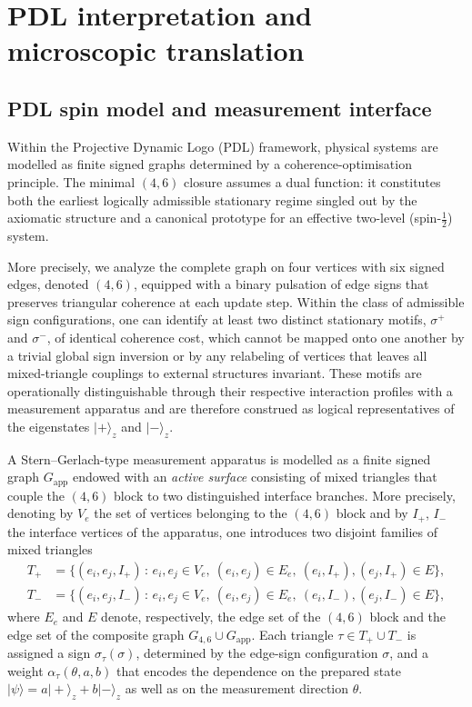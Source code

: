 \documentclass[11pt,a4paper]{article}
\numberwithin{equation}{section}
\theoremstyle{definition}
\begin{document}
\section{PDL interpretation and microscopic translation}
\label{sec:PDL-translation}

\subsection{PDL spin model and measurement interface}

Within the Projective Dynamic Logo (PDL) framework, physical systems are modelled as finite signed graphs determined by a coherence-optimisation principle.\cite{LaubscherLDP2026} The minimal $(4,6)$ closure assumes a dual function: it constitutes both the earliest logically admissible stationary regime singled out by the axiomatic structure and a canonical prototype for an effective two-level (spin-$\tfrac12$) system.\cite{LaubscherIntroPDL2026}

More precisely, we analyze the complete graph on four vertices with six signed edges, denoted \((4,6)\), equipped with a binary pulsation of edge signs that preserves triangular coherence at each update step. Within the class of admissible sign configurations, one can identify at least two distinct stationary motifs, \(\sigma^+\) and \(\sigma^-\), of identical coherence cost, which cannot be mapped onto one another by a trivial global sign inversion or by any relabeling of vertices that leaves all mixed-triangle couplings to external structures invariant.\cite{LaubscherBornPDL2026} These motifs are operationally distinguishable through their respective interaction profiles with a measurement apparatus and are therefore construed as logical representatives of the eigenstates \(\lvert + \rangle_z\) and \(\lvert - \rangle_z\).

A Stern–Gerlach-type measurement apparatus is modelled as a finite signed graph $G_{\mathrm{app}}$ endowed with an \emph{active surface} consisting of mixed triangles that couple the $(4,6)$ block to two distinguished interface branches.\cite{LaubscherBornPDL2026} More precisely, denoting by $V_e$ the set of vertices belonging to the $(4,6)$ block and by $I_+$, $I_-$ the interface vertices of the apparatus, one introduces two disjoint families of mixed triangles
\begin{align}
T_+ &= \bigl\{ (e_i,e_j,I_+)\,:\, e_i,e_j\in V_e,\ (e_i,e_j)\in E_e,\ 
(e_i,I_+),(e_j,I_+)\in E \bigr\},\\
T_- &= \bigl\{ (e_i,e_j,I_-)\,:\, e_i,e_j\in V_e,\ (e_i,e_j)\in E_e,\ 
(e_i,I_-),(e_j,I_-)\in E \bigr\},
\end{align}
where $E_e$ and $E$ denote, respectively, the edge set of the $(4,6)$ block and the edge set of the composite graph $G_{4,6}\cup G_{\mathrm{app}}$. Each triangle $\tau\in T_+\cup T_-$ is assigned a sign $\sigma_\tau(\sigma)$, determined by the edge-sign configuration $\sigma$, and a weight $\alpha_\tau(\theta,a,b)$ that encodes the dependence on the prepared state $|\psi\rangle=a|+\rangle_z + b|-\rangle_z$ as well as on the measurement direction $\theta$.
\end{document}
